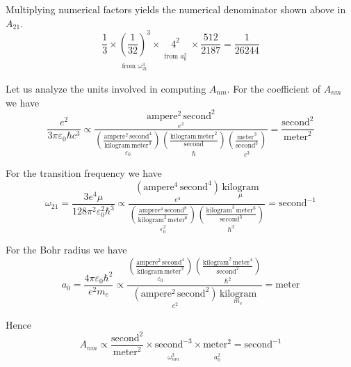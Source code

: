 \documentclass[12pt]{article}
\begin{document}
\noindent
Multiplying numerical factors yields the numerical denominator shown above in $A_{21}$.
\begin{equation*}
\frac{1}{3}
\times
\underset{\substack{\\[1ex]\text{from $\omega_{21}^3$}}}
{\left(\frac{1}{32}\right)^3}
\times
\underset{\substack{\\[1ex]\text{from $a_0^2$}}}{4^2}
\times\frac{512}{2187}=\frac{1}{26244}
\end{equation*}

\noindent
Let us analyze the units involved in computing $A_{nm}$.
For the coefficient of $A_{nm}$ we have
\begin{equation*}
\frac{e^2}{3\pi\varepsilon_0\hbar c^3}\propto
\frac{
\underset{e^2}
{\text{ampere}^2\,\text{second}^2}
}
{
\underset{\varepsilon_0}
{\left(\frac{\text{ampere}^2\,\text{second}^4}{\text{kilogram}\,\text{meter}^3}\right)}
\underset{\hbar}
{\left(\frac{\text{kilogram}\,\text{meter}^2}{\text{second}}\right)}
\underset{c^3}
{\left(\frac{\text{meter}^3}{\text{second}^3}\right)}
}
=\frac{\text{second}^2}{\text{meter}^2}
\end{equation*}

\noindent
For the transition frequency we have
\begin{equation*}
\omega_{21}=
\frac{3e^4\mu}{128\pi^2\varepsilon_0^2\hbar^3}
\propto
\frac{
\underset{e^4}
{\left(\text{ampere}^4\,\text{second}^4\right)}
\,
\underset{\mu}
{\text{kilogram}}
}
{
\underset{\varepsilon_0^2}
{\left(\frac{\text{ampere}^4\,\text{second}^8}{\text{kilogram}^2\,\text{meter}^6}\right)}
\underset{\hbar^3}
{\left(\frac{\text{kilogram}^3\,\text{meter}^6}{\text{second}^3}\right)}
}
=\text{second}^{-1}
\end{equation*}

\noindent
For the Bohr radius we have
\begin{equation*}
a_0=\frac{4\pi\varepsilon_0\hbar^2}{e^2 m_e}
\propto
\frac
{
\underset{\varepsilon_0}
{\left(\frac{\text{ampere}^2\,\text{second}^4}{\text{kilogram}\,\text{meter}^3}\right)}
\underset{\hbar^2}
{\left(\frac{\text{kilogram}^2\,\text{meter}^4}{\text{second}^2}\right)}
}
{
\underset{e^2}
{\left(\text{ampere}^2\,\text{second}^2\right)}
\,
\underset{m_e}
{\text{kilogram}}
}
=\text{meter}
\end{equation*}

\noindent
Hence
\begin{equation*}
A_{nm}\propto
\frac{\text{second}^2}{\text{meter}^2}
\times
\underset{\substack{\\[1ex]\omega_{nm}^3}}{\text{second}^{-3}}
\times
\underset{\substack{\\[1ex]a_0^2}}{\text{meter}^2}
=\text{second}^{-1}
\end{equation*}
\end{document}
